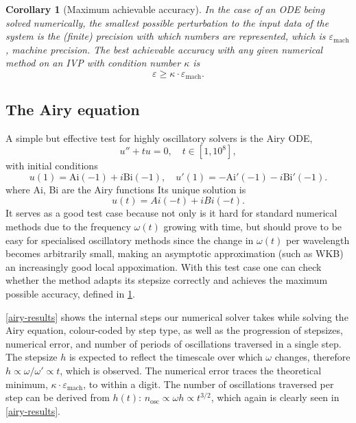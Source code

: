 \documentclass[10pt]{article}
\newcommand{\be}{\begin{equation}}
\newcommand{\ee}{\end{equation}}
\newtheorem{cor}[thm]{Corollary}
\newcommand{\om}{\omega}
\newcommand{\AB}[1]{{\color{orange}#1}}
\begin{document}
\begin{cor}[Maximum achievable accuracy]\label{mineps}
In the case of an ODE being solved numerically, the smallest possible
perturbation to the input data of the system is the (finite) precision with
which numbers are represented, which is $\varepsilon_{\mathrm{mach}}$, machine
precision. The best achievable accuracy with any given numerical method on an
IVP with condition number $\kappa$ is 
\be
\varepsilon \geq \kappa \cdot \varepsilon_{\mathrm{mach}}.
\ee
\end{cor}

\subsection{The Airy equation}\label{airy-demo}

A simple but effective test for highly oscillatory solvers is the Airy ODE,
\be
u'' + tu = 0, \quad t \in [1, 10^8], 
\ee
with initial conditions
\be
u(1) = \text{Ai}(-1) + i\text{Bi}(-1), \quad u'(1) = - \text{Ai}'(-1) -i\text{Bi}'(-1).
\ee
where Ai, Bi are the Airy functions \cite[Chapter~9]{DLMFairy}
Its unique solution is
\be
u(t) = Ai(-t) + iBi(-t).
\ee
It serves as a good test case because not only is it hard
 for standard numerical methods due to the frequency $\om(t)$ growing with time, but should prove to
be easy for specialised oscillatory methods since the change in $\om(t)$ per wavelength becomes arbitrarily small, making an asymptotic approximation (such as WKB) 
an increasingly good local appoximation.
With this test
case one can check whether the method adapts its stepsize correctly and
achieves the maximum possible accuracy, defined in \cref{mineps}.


\cref{airy-results} shows the
internal steps our numerical solver takes while solving the Airy equation,
colour-coded by step type, as well as the progression of stepsizes, numerical
error, and number of periods of oscillations traversed in a single step. The
stepsize $h$ is expected to reflect the timescale over which $\om$ changes,
therefore $h \propto \om/\om' \propto t$, which is observed. The numerical
error traces the theoretical minimum, $\kappa \cdot \varepsilon_{\text{mach}}$, to
within a digit. The number of oscillations traversed per step can be derived
from $h(t)$: $n_{\text{osc}} \propto \om h \propto t^{3/2}$, which again is
clearly seen in \cref{airy-results}.
\end{document}
